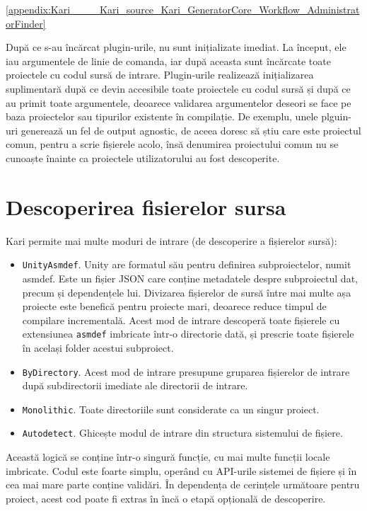 \documentclass[a4paper,12pt]{report}
\begin{document}
\ref{appendix:Kari____Kari_source_Kari_GeneratorCore_Workflow_AdministratorFinder}

După ce s-au încărcat plugin-urile, nu sunt inițializate imediat.
La început, ele iau argumentele de linie de comanda, iar după aceasta sunt încărcate toate proiectele cu codul sursă de intrare.
Plugin-urile realizează inițializarea suplimentară după ce devin accesibile toate proiectele cu codul sursă și după ce au primit toate argumentele, deoarece validarea argumentelor deseori se face pe baza proiectelor sau tipurilor existente în compilație.
De exemplu, unele plguin-uri generează un fel de output agnostic, de aceea doresc să știu care este proiectul comun, pentru a scrie fișierele acolo, însă denumirea proiectului comun nu se cunoaște înainte ca proiectele utilizatorului au fost descoperite.

\section{Descoperirea fisierelor sursa}

Kari permite mai multe moduri de intrare (de descoperire a fișierelor sursă):

\begin{itemize}
  \item \texttt{UnityAsmdef}.
    Unity are formatul său pentru definirea subproiectelor, numit asmdef.
    Este un fișier JSON care conține metadatele despre subproiectul dat, precum și dependențele lui.
    Divizarea fișierelor de sursă între mai multe așa proiecte este benefică pentru proiecte mari, deoarece reduce timpul de compilare incrementală.
    Acest mod de intrare descoperă toate fișierele cu extensiunea \texttt{asmdef} imbricate într-o directorie dată, și prescrie toate fișierele în același folder acestui subproiect.

  \item \texttt{ByDirectory}. Acest mod de intrare presupune gruparea fișierelor de intrare după subdirectorii imediate ale directorii de intrare.

  \item \texttt{Monolithic}. Toate directoriile sunt considerate ca un singur proiect.

  \item \texttt{Autodetect}. Ghicește modul de intrare din structura sistemului de fișiere.
\end{itemize}

Această logică se conține într-o singură funcție, cu mai multe funcții locale imbricate.
Codul este foarte simplu, operând cu API-urile sistemei de fișiere și în cea mai mare parte conține validări.
În dependența de cerințele următoare pentru proiect, acest cod poate fi extras în încă o etapă opțională de descoperire.
\end{document}

